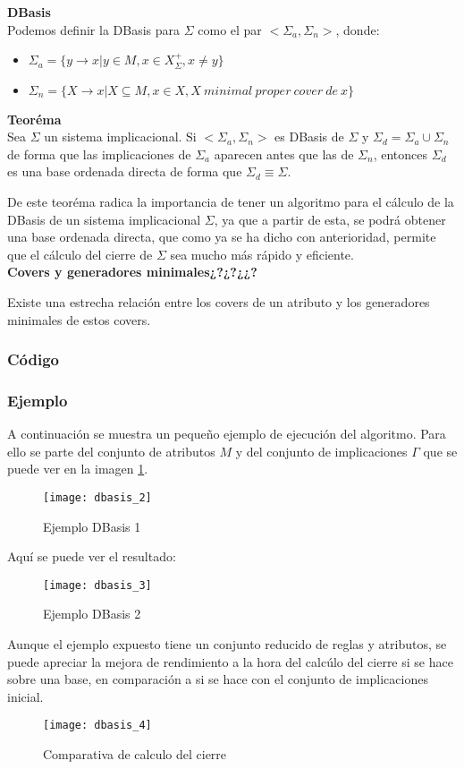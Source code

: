 \textbf{DBasis}\\
Podemos definir la DBasis para \(\Sigma\) como el par \(<\Sigma_a, \Sigma_n>\), donde:

\begin{itemize}
    \item \(\Sigma_a = \{y \to x | y \in M, x \in X^+_{\Sigma}, x \neq y \} \)
    \item \(\Sigma_n = \{X \to x | X \subseteq M, x \in X, X \ minimal \ proper \ cover \ de \ x\} \)

\end{itemize}

\textbf{Teor\'ema}\\
Sea \(\Sigma\) un sistema implicacional. Si \(<\Sigma_a, \Sigma_n>\) es DBasis de \(\Sigma\) y \(\Sigma_d = \Sigma_a\cup \Sigma_n\) de forma que las implicaciones de \(\Sigma_a\) aparecen antes que las de \(\Sigma_n\), entonces \(\Sigma_d\) es una base ordenada directa de forma que \(\Sigma_d \equiv \Sigma\).

De este teor\'ema radica la importancia de tener un algoritmo para el c\'alculo de la DBasis de un sistema implicacional \(\Sigma\), ya que a partir de esta, se podr\'a obtener una base ordenada directa, que como ya se ha dicho con anterioridad, permite que el c\'alculo del cierre de \(\Sigma\) sea mucho m\'as r\'apido y eficiente.\\

\textbf{Covers y generadores minimales¿?¿?¿¿?}

Existe una estrecha relaci\'on entre los covers de un atributo y los generadores minimales de estos covers.
\newpage 
\subsubsection{C\'odigo} 

\newpage
\subsubsection{Ejemplo}
A continuaci\'on se muestra un peque\~no ejemplo de ejecuci\'on del algoritmo. Para ello se parte del conjunto de atributos \(M\) y del conjunto de implicaciones \(\Gamma\) que se puede ver en la imagen \ref{fig:dbasis_2}.
\begin{figure}[H]
    \centering
    \texttt{[image: dbasis\_2]}
    \caption{Ejemplo DBasis 1}
    \label{fig:dbasis_2}
\end{figure} 
Aqu\'i se puede ver el resultado:
\begin{figure}[H]
    \centering
    \texttt{[image: dbasis\_3]}
    \caption{Ejemplo DBasis 2}
    \label{fig:dbasis_3}
\end{figure} 
Aunque el ejemplo expuesto tiene un conjunto reducido de reglas y atributos, se puede apreciar la mejora de rendimiento a la hora del calc\'ulo del cierre si se hace sobre una base, en comparaci\'on a si se hace con el conjunto de implicaciones inicial.
\begin{figure}[H]
    \centering
    \texttt{[image: dbasis\_4]}
    \caption{Comparativa de calculo del cierre}
    \label{fig:dbasis_4}
\end{figure} 